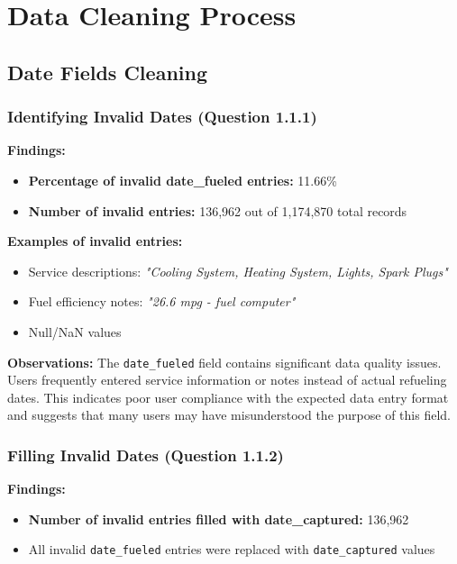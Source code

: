 \documentclass{article}
\begin{document}
\section{Data Cleaning Process}

\subsection{Date Fields Cleaning}

\subsubsection{Identifying Invalid Dates (Question 1.1.1)}

\textbf{Findings:}
\begin{itemize}
    \item \textbf{Percentage of invalid date\_fueled entries:} 11.66\%
    \item \textbf{Number of invalid entries:} 136,962 out of 1,174,870 total records
\end{itemize}

\textbf{Examples of invalid entries:}
\begin{itemize}
    \item Service descriptions: \textit{"Cooling System, Heating System, Lights, Spark Plugs"}
    \item Fuel efficiency notes: \textit{"26.6 mpg - fuel computer"}
    \item Null/NaN values
\end{itemize}

\textbf{Observations:}
The \texttt{date\_fueled} field contains significant data quality issues. Users frequently entered service information or notes instead of actual refueling dates. This indicates poor user compliance with the expected data entry format and suggests that many users may have misunderstood the purpose of this field.

\subsubsection{Filling Invalid Dates (Question 1.1.2)}

\textbf{Findings:}
\begin{itemize}
    \item \textbf{Number of invalid entries filled with date\_captured:} 136,962
    \item All invalid \texttt{date\_fueled} entries were replaced with \texttt{date\_captured} values
\end{itemize}
\end{document}
